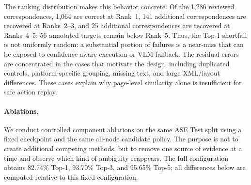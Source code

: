 The ranking distribution makes this behavior concrete.  Of the 1,286 reviewed
correspondences, 1,064 are correct at Rank~1, 141 additional correspondences
are recovered at Ranks~2--3, and 25 additional correspondences are recovered
at Ranks~4--5; 56 annotated targets remain below Rank~5.  Thus, the Top-1
shortfall is not uniformly random: a substantial portion of failures is a
near-miss that can be exposed to confidence-aware execution or VLM fallback.
The residual errors are concentrated in the cases that motivate the design,
including duplicated controls, platform-specific grouping, missing text, and
large XML/layout differences.  These cases explain why page-level similarity
alone is insufficient for safe action replay.

\paragraph{Ablations.}
We conduct controlled component ablations on the same ASE Test split using a
fixed checkpoint and the same all-node candidate policy.  The purpose is not to
create additional competing methods, but to remove one source of evidence at a
time and observe which kind of ambiguity reappears.  The full configuration
obtains 82.74\% Top-1, 93.70\% Top-3, and 95.65\% Top-5; all differences below
are computed relative to this fixed configuration.

\begin{table}[t]
  \centering
  \scriptsize
  \caption{Unified component ablation on ASE Test.  All rows use the same fixed
  checkpoint, 98 page pairs, 196 mapping directions, and 1,286 reviewed
  correspondences.}
  \label{tab:omnitransfer-ablation}
\end{table}

